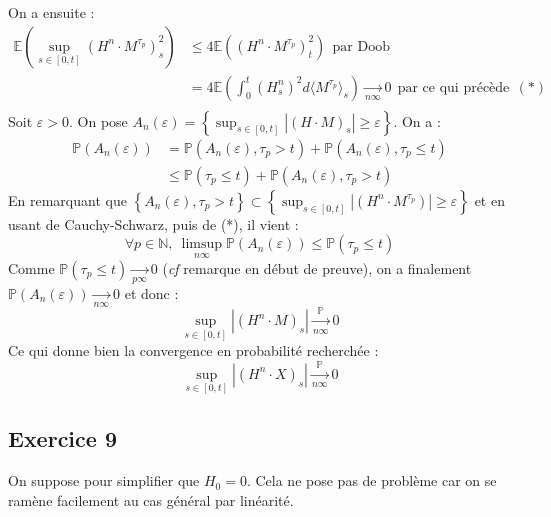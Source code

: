 \documentclass[a4paper,12pt]{article}
\newcommand{\E}{\mathbb{E}}
\newcommand{\prob}{\mathbb{P}}
\newcommand{\n}{\mathbb{N}}
\begin{document}
On a ensuite :
\begin{align*}
\E \left(  \sup_{s \in [0,t]} (H^n \cdot M^{\tau_p})^2_s \right) & \leq 4 \E \left( (H^n \cdot M^{\tau_p})_t^2 \right) \ \ \text{par Doob} \\
& = 4 \E \left( \int_0^t (H_s^n)^2 d \langle M^{\tau_p} \rangle_s \right) \xrightarrow[n \infty]{} 0 \ \ \text{par ce qui précède} \ \ (*)\\
\end{align*}
Soit $\varepsilon >0$. On pose $A_n (\varepsilon ) = \left\{ \sup_{s \in [0,t]} |(H \cdot M)_s| \geq \varepsilon \right\}$. On a : 
\begin{align*}
\prob (A_n (\varepsilon)) & = \prob (A_n (\varepsilon), \tau_p > t) + \prob (A_n(\varepsilon), \tau_p \leq t) \\
& \leq \prob (\tau_p \leq t) + \prob (A_n (\varepsilon), \tau_p > t)
\end{align*}
En remarquant que $\left\{ A_n (\varepsilon), \tau_p > t \right\} \subset \left\{ \sup_{s \in [0,t]} |(H^n \cdot M^{\tau_p})| \geq \varepsilon \right\}$ et en usant de Cauchy-Schwarz, puis de (*), il vient :
$$ \forall p \in \n, \ \limsup_{n \infty} \prob (A_n (\varepsilon)) \leq \prob (\tau_p \leq t )$$
Comme $\prob (\tau_p \leq t ) \xrightarrow[p \infty]{} 0$ (\textit{cf} remarque en début de preuve), on a finalement $\prob (A_n (\varepsilon)) \xrightarrow[n \infty]{} 0$ et donc :
$$\sup_{s \in [0,t]} |(H^n \cdot M)_s| \xrightarrow[n \infty]{\prob} 0 $$
Ce qui donne bien la convergence en probabilité recherchée :
$$\sup_{s \in [0,t]} |(H^n \cdot X)_s| \xrightarrow[n \infty]{\prob} 0$$

\subsection{Exercice 9}
On suppose pour simplifier que $H_0=0$. Cela ne pose pas de problème car on se ramène facilement au cas général par linéarité.\\
\end{document}
